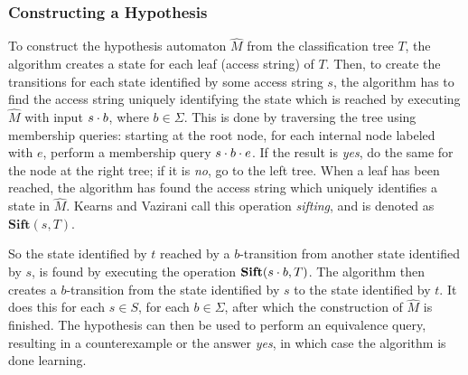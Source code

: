 \documentclass[multi,crop=false,class=article]{standalone}
\begin{document}
\subsubsection{Constructing a Hypothesis}
\label{sec:constr-hypoth}
To construct the hypothesis automaton $\hat M$ from the classification tree $T$,
the algorithm creates a state for each leaf (access string) of $T$. Then, to
create the transitions for each state identified by some access string $s$, the
algorithm has to find the access string uniquely identifying the state which is
reached by executing $\hat M$ with input $s \cdot b$, where $b \in
\Sigma$. This is done by traversing the tree using membership queries: starting
at the root node, for each internal node labeled with $e$, perform a membership
query $s \cdot b \cdot e$. If the result is \textit{yes}, do the same for
the node at the right tree; if it is \textit{no}, go to the left tree. When a
leaf has been reached, the algorithm has found the access string which uniquely
identifies a state in $\hat M$. Kearns and Vazirani call this operation
\textit{sifting}, and is denoted as $\textbf{Sift}(s, T)$\cite{Kearns94}.

So the state identified by $t$ reached by a $b$-transition from another state
identified by $s$, is found by executing the operation
$\textbf{Sift}(s \cdot b,T)$. The algorithm then creates a $b$-transition from
the state identified by $s$ to the state identified by $t$. It does this for
each $s \in S$, for each $b \in \Sigma$, after which the construction of
$\hat M$ is finished. The hypothesis can then be used to perform an equivalence
query, resulting in a counterexample or the answer \textit{yes}, in which case
the algorithm is done learning.
\end{document}
